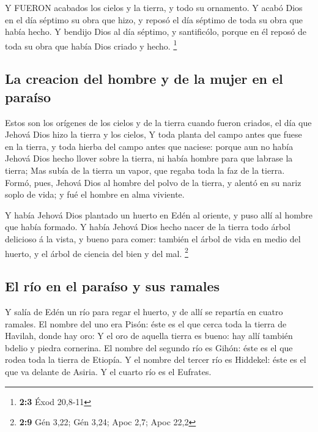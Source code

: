  Y FUERON acabados los cielos y la tierra, y todo su
ornamento.  Y acabó Dios en el día séptimo su obra que hizo,
y reposó el día séptimo de toda su obra que había hecho.  Y
bendijo Dios al día séptimo, y santificólo, porque en él reposó de toda
su obra que había Dios criado y hecho. \footnote{\textbf{2:3} Éxod
  20,8-11}

\hypertarget{la-creacion-del-hombre-y-de-la-mujer-en-el-parauxedso}{%
\subsection{La creacion del hombre y de la mujer en el
paraíso}\label{la-creacion-del-hombre-y-de-la-mujer-en-el-parauxedso}}

 Estos son los orígenes de los cielos y de la tierra cuando
fueron criados, el día que Jehová Dios hizo la tierra y los cielos,
 Y toda planta del campo antes que fuese en la tierra, y
toda hierba del campo antes que naciese: porque aun no había Jehová Dios
hecho llover sobre la tierra, ni había hombre para que labrase la
tierra;  Mas subía de la tierra un vapor, que regaba toda la
faz de la tierra.  Formó, pues, Jehová Dios al hombre del
polvo de la tierra, y alentó en su nariz soplo de vida; y fué el hombre
en alma viviente.

 Y había Jehová Dios plantado un huerto en Edén al oriente,
y puso allí al hombre que había formado.  Y había Jehová
Dios hecho nacer de la tierra todo árbol delicioso á la vista, y bueno
para comer: también el árbol de vida en medio del huerto, y el árbol de
ciencia del bien y del mal. \footnote{\textbf{2:9} Gén 3,22; Gén 3,24;
  Apoc 2,7; Apoc 22,2}

\hypertarget{el-ruxedo-en-el-parauxedso-y-sus-ramales}{%
\subsection{El río en el paraíso y sus
ramales}\label{el-ruxedo-en-el-parauxedso-y-sus-ramales}}

 Y salía de Edén un río para regar el huerto, y de allí se
repartía en cuatro ramales.  El nombre del uno era Pisón:
éste es el que cerca toda la tierra de Havilah, donde hay oro:
 Y el oro de aquella tierra es bueno: hay allí también
bdelio y piedra cornerina.  El nombre del segundo río es
Gihón: éste es el que rodea toda la tierra de Etiopía.  Y
el nombre del tercer río es Hiddekel: éste es el que va delante de
Asiria. Y el cuarto río es el Eufrates.

